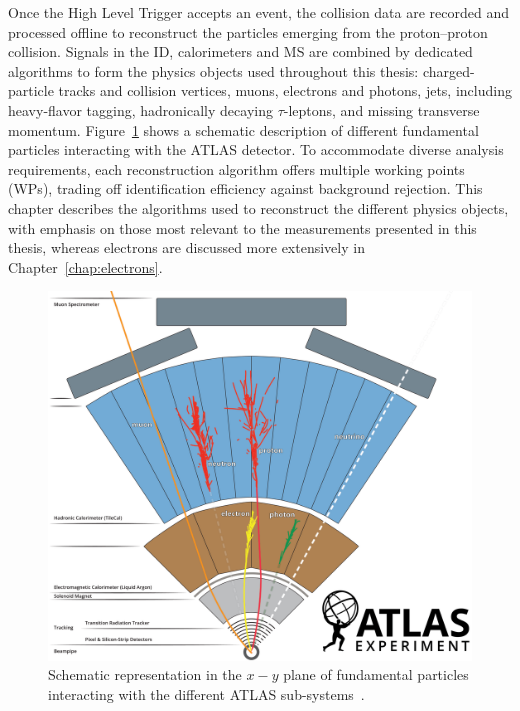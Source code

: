 \newcommand*{\antikt}{anti-$\kappa_{t}$\xspace}
\newcommand*{\et}{$E^{\text{miss}}_{\text{T}}$\xspace}
\newcommand*{\tauhadvis}{$\tau_{\text{had-vis}}$\xspace}
\newcommand*{\tauhad}{$\tau_{\text{had}}$\xspace}
\newcommand*{\ttbar}{$\bar{t}t$\xspace}

Once the High Level Trigger accepts an event, the collision data are recorded and processed offline to reconstruct the particles emerging from the proton–proton collision. 
Signals in the ID, calorimeters and MS are combined by dedicated algorithms to form the physics objects used throughout this thesis: charged-particle tracks and collision vertices, muons, electrons and photons, jets, including heavy-flavor tagging, hadronically decaying $\tau$-leptons, and missing transverse momentum. Figure~\ref{fig:reco} shows a schematic description of different fundamental particles interacting with the \acrshort{ATLAS} detector. 
To accommodate diverse analysis requirements, each reconstruction algorithm offers multiple working points (WPs), trading off identification efficiency against background rejection. This chapter describes the algorithms used to reconstruct the different physics objects, with emphasis on those most relevant to the measurements presented in this thesis, whereas electrons are discussed more extensively in Chapter~\ref{chap:electrons}.

\begin{figure}[htbp]
  \centering
  \includegraphics[width=1.0\textwidth]{images/atlas_particles.png}
  \caption{Schematic representation in the $x-y$ plane of fundamental particles interacting with the different ATLAS sub-systems~\cite{Bianchi:2837191}.}
  \label{fig:reco}
 \end{figure}

